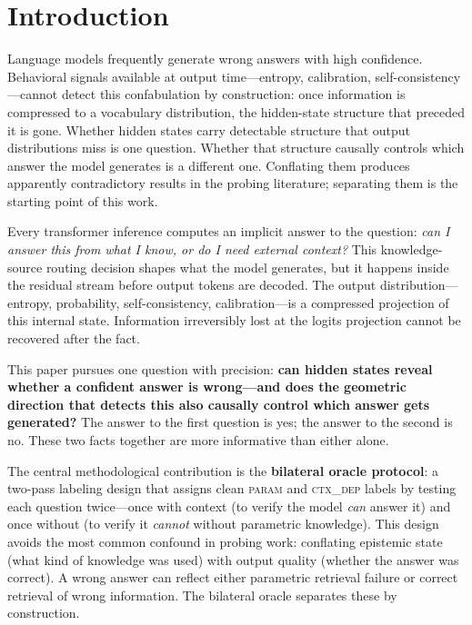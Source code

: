 \documentclass[11pt]{article}
\begin{document}
\newpage
\tableofcontents
\newpage

\section{Introduction}

Language models frequently generate wrong answers with high confidence. Behavioral
signals available at output time---entropy, calibration, self-consistency---cannot
detect this confabulation by construction: once information is compressed to a
vocabulary distribution, the hidden-state structure that preceded it is gone. Whether
hidden states carry detectable structure that output distributions miss is one question.
Whether that structure causally controls which answer the model generates is a different
one. Conflating them produces apparently contradictory results in the probing literature;
separating them is the starting point of this work.

Every transformer inference computes an implicit answer to the question: \emph{can
I answer this from what I know, or do I need external context?} This knowledge-source
routing decision shapes what the model generates, but it happens inside the residual
stream before output tokens are decoded. The output distribution---entropy, probability,
self-consistency, calibration---is a compressed projection of this internal state.
Information irreversibly lost at the logits projection cannot be recovered after
the fact.

This paper pursues one question with precision: \textbf{can hidden states reveal whether
a confident answer is wrong---and does the geometric direction that detects this also
causally control which answer gets generated?} The answer to the first question is yes;
the answer to the second is no. These two facts together are more informative than either
alone.

The central methodological contribution is the \textbf{bilateral oracle protocol}: a
two-pass labeling design that assigns clean \textsc{param} and \textsc{ctx\_dep} labels
by testing each question twice---once with context (to verify the model \emph{can}
answer it) and once without (to verify it \emph{cannot} without parametric knowledge).
This design avoids the most common confound in probing work: conflating epistemic state
(what kind of knowledge was used) with output quality (whether the answer was correct).
A wrong answer can reflect either parametric retrieval failure or correct retrieval of
wrong information. The bilateral oracle separates these by construction.
\end{document}
